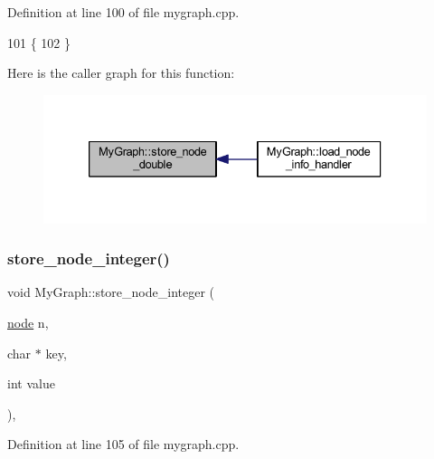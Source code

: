 Definition at line 100 of file mygraph.\+cpp.


\begin{DoxyCode}
101 \{
102 \}
\end{DoxyCode}
Here is the caller graph for this function\+:
\nopagebreak
\begin{figure}[H]
\begin{center}
\leavevmode
\includegraphics[width=333pt]{class_my_graph_a16b037dbb0011fc50367145c477ac7a4_icgraph}
\end{center}
\end{figure}
\mbox{\label{class_my_graph_a4f5922407f2f3fac566d1045d98da46f}} 
\subsubsection{\texorpdfstring{store\+\_\+node\+\_\+integer()}{store\_node\_integer()}}
{\footnotesize\ttfamily void My\+Graph\+::store\+\_\+node\+\_\+integer (\begin{DoxyParamCaption}\item[{\mbox{\hyperlink{classnode}{node}}}]{n,  }\item[{char $\ast$}]{key,  }\item[{int}]{value }\end{DoxyParamCaption})\hspace{0.3cm}{\ttfamily [virtual]}, {\ttfamily [inherited]}}



Definition at line 105 of file mygraph.\+cpp.


